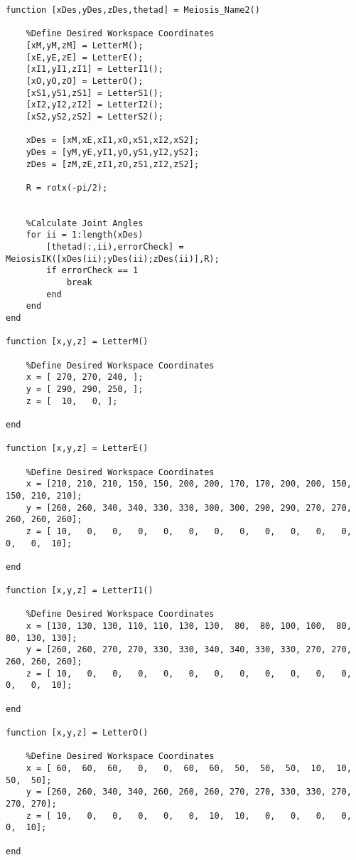 \begin{lstlisting}[frame=lines,style=Matlab-editor,basicstyle = \mlttfamily, caption=MEIOSIS Name Plotting]
function [xDes,yDes,zDes,thetad] = Meiosis_Name2()

    %Define Desired Workspace Coordinates
    [xM,yM,zM] = LetterM();
    [xE,yE,zE] = LetterE();
    [xI1,yI1,zI1] = LetterI1();
    [xO,yO,zO] = LetterO();
    [xS1,yS1,zS1] = LetterS1();
    [xI2,yI2,zI2] = LetterI2();
    [xS2,yS2,zS2] = LetterS2();

    xDes = [xM,xE,xI1,xO,xS1,xI2,xS2];
    yDes = [yM,yE,yI1,yO,yS1,yI2,yS2];
    zDes = [zM,zE,zI1,zO,zS1,zI2,zS2];

    R = rotx(-pi/2);


    %Calculate Joint Angles
    for ii = 1:length(xDes)
        [thetad(:,ii),errorCheck] = MeiosisIK([xDes(ii);yDes(ii);zDes(ii)],R);
        if errorCheck == 1
            break
        end
    end
end

function [x,y,z] = LetterM()

    %Define Desired Workspace Coordinates
    x = [ 270, 270, 240, ];
    y = [ 290, 290, 250, ];
    z = [  10,   0, ];

end

function [x,y,z] = LetterE()

    %Define Desired Workspace Coordinates
    x = [210, 210, 210, 150, 150, 200, 200, 170, 170, 200, 200, 150, 150, 210, 210];
    y = [260, 260, 340, 340, 330, 330, 300, 300, 290, 290, 270, 270, 260, 260, 260];
    z = [ 10,   0,   0,   0,   0,   0,   0,   0,   0,   0,   0,   0,   0,   0,  10];

end

function [x,y,z] = LetterI1()

    %Define Desired Workspace Coordinates
    x = [130, 130, 130, 110, 110, 130, 130,  80,  80, 100, 100,  80,  80, 130, 130];
    y = [260, 260, 270, 270, 330, 330, 340, 340, 330, 330, 270, 270, 260, 260, 260];
    z = [ 10,   0,   0,   0,   0,   0,   0,   0,   0,   0,   0,   0,   0,   0,  10];

end

function [x,y,z] = LetterO()

    %Define Desired Workspace Coordinates
    x = [ 60,  60,  60,   0,   0,  60,  60,  50,  50,  50,  10,  10,  50,  50];
    y = [260, 260, 340, 340, 260, 260, 260, 270, 270, 330, 330, 270, 270, 270];
    z = [ 10,   0,   0,   0,   0,   0,  10,  10,   0,   0,   0,   0,   0,  10];

end


\end{lstlisting}
